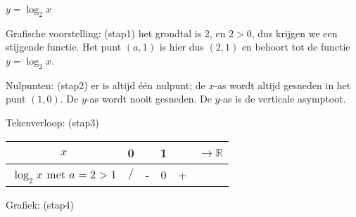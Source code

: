 \begin{voorbeeld}
$y=\log_{2}x$

Grafische voorstelling: (stap1) het grondtal is 2, en $2>0$,
dus krijgen we een stijgende functie. Het punt $(a,1)$ is hier dus
$(2,1)$ en behoort tot de functie $y=\log_{2}x$.


Nulpunten: (stap2) er is altijd \'e\'en nulpunt; de
$x$-as wordt altijd gesneden in het punt $(1,0)$. De $y$-as wordt nooit
gesneden. De $y$-as is de verticale asymptoot.


Tekenverloop: (stap3) %
\begin{tabular}{c|ccccc}
	$x$ & 0 &  & 1 &  & $\longrightarrow\mathbb{R}$\\
	\hline 
	$\log_{2}x$ met $a=2>1$ & $/$ & - & 0 & + & \multicolumn{1}{c}{}\\
\end{tabular}

Grafiek: (stap4) 


\end{voorbeeld}

